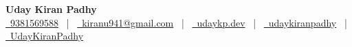 \begin{center}
    {\LARGE\textbf{Uday Kiran Padhy}} \\ \vspace{4pt}
    \small%
    \href{tel:+919381569588}{\faPhone~9381569588} ~|~%
    \href{mailto:kiranu941@gmail.com}{\faEnvelope~kiranu941@gmail.com} ~|~%
    \href{https://udaykp.dev}{\faGlobe~udaykp.dev} ~|~%
    \href{https://www.linkedin.com/in/udaykiranpadhy/}{\faLinkedin~udaykiranpadhy} ~|~%
    \href{https://github.com/UdayKiranPadhy}{\faGithub~UdayKiranPadhy}
\end{center}
\vspace{-6pt}
